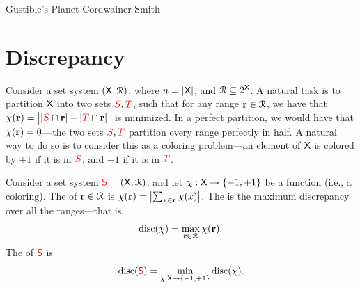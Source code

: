 \makeatletter
{}
\makeatother
\ifx\bookMode\undefined%
\fi
{}

\ChapterPrefix{}
\ChapterGen{}



%
{Gustible's Planet}%
{Cordwainer Smith}



\section{Discrepancy}

Consider a set system $(\textsf{X},\EuScript{R})$, where
$n =\left| {\textsf{X}} \right|$, and $\EuScript{R} \subseteq 2^{\textsf{X}}$. A
natural task is to partition $\textsf{X}$ into two sets
${\textcolor{red}{S}}, {\textcolor{red}{T}}$, such that for any range $\mathbf{r} \in \EuScript{R}$, we have
that
\begin{math}
    \chi(\mathbf{r}) = \left| {\bigl. \left| {{\textcolor{red}{S}} \cap \mathbf{r}} \right| -
       \left| {{\textcolor{red}{T}} \cap \mathbf{r}} \right|} \right|
\end{math}
is minimized. In a perfect partition, we would have that
$\chi(\mathbf{r}) = 0$---the two sets ${\textcolor{red}{S}},{\textcolor{red}{T}}$ partition every range
perfectly in half. A natural way to do so is to consider this as a
coloring problem---an element of $\textsf{X}$ is colored by $+1$ if
it is in ${\textcolor{red}{S}}$, and $-1$ if it is in ${\textcolor{red}{T}}$.


\begin{defn} 
    Consider a set system ${\textcolor{red}{\mathsf{S}}} = (\textsf{X},\EuScript{R})$, and let
    $\chi: \textsf{X} \rightarrow \left\{ {-1,+1} \right\}$ be a function (i.e., a
    coloring).  The  of $\mathbf{r} \in \EuScript{R}$ is
    $\chi(\mathbf{r}) = \left| {\sum_{x \in \mathbf{r}} \chi(x)} \right|$.  The
     is the maximum discrepancy over all
    the ranges---that is,
    \begin{equation*}
        \discX{\chi} = \max_{\range \in \Ranges} \chi(\range).
    \end{equation*}
    The  of ${\textcolor{red}{\mathsf{S}}}$ is
    \begin{equation*}
        \discX{\RangeSpace}%
        =%
        \min_{\chi:\GroundSet \rightarrow \brc{-1,+1}} \discX{\chi}.
    \end{equation*}    
\end{defn}

